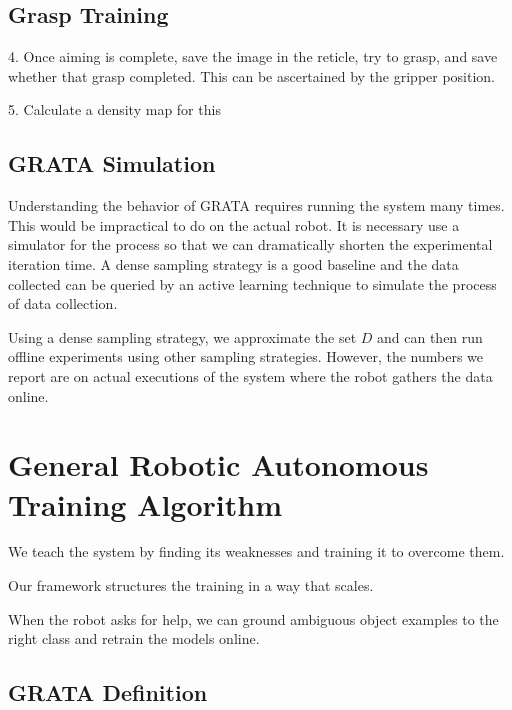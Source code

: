 \subsection{Grasp Training}
4. Once aiming is complete, save the image in the reticle, try to grasp, and save whether that grasp completed.
This can be ascertained by the gripper position.

5. Calculate a density map for this 



\subsection{GRATA Simulation}
Understanding the behavior of GRATA requires running the system many times. This would be impractical
to do on the actual robot. It is necessary use a simulator for the process so that we can dramatically shorten the
experimental iteration time. A dense sampling strategy is a good baseline and the data collected can
be queried by an active learning technique to simulate the process of data collection.

Using a dense sampling strategy, we approximate the set $D$ and can then run offline experiments using other
sampling strategies. However, the numbers we report are on actual executions of the system where
the robot gathers the data online.




\section{General Robotic Autonomous Training Algorithm}
\label{sec:training}
We teach the system by finding its weaknesses and training it to overcome them.

Our framework structures the training in a way that scales. 

When the robot asks for help, we can ground ambiguous object examples to the right class
and retrain the models online.

\subsection{GRATA Definition}

